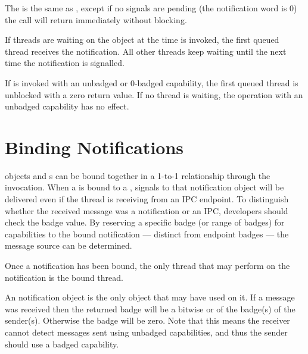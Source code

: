 The  is the same as , except if 
no signals are pending (the notification word is 0) the call will return immediately
without blocking.

If threads are waiting on the  object at the time
 is invoked, the first queued thread
receives the notification. All other threads keep waiting until the
next time the notification is signalled. 

If  is invoked with an unbadged or 0-badged
capability, the first queued thread is unblocked with a zero return value. If
no thread is waiting, the  operation with
an unbadged capability has no effect.


\section{Binding Notifications}
\label{sec:notification-binding}

 objects and s can be bound together in a 1-to-1 relationship
through the  invocation. When a
 is bound to a , signals to that notification object
will be delivered even if the thread is receiving from an IPC
endpoint. To distinguish whether the received message was a notification
or an IPC, developers should check the badge value. By reserving a
specific badge (or range of badges) for capabilities to the bound
notification --- distinct from endpoint badges --- the
message source can be determined.

Once a notification has been bound, the only thread that may perform
 on the notification is the bound thread.

An notification object is the only object that may have
 used on it. If a message was received then the
returned badge will be a bitwise or of the badge(s) of the sender(s). Otherwise
the badge will be zero. Note that this means the receiver cannot detect
messages sent using unbadged capabilities, and thus the sender should use a
badged capability.

